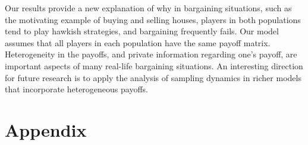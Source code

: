 \documentclass[12pt]{article}
\numberwithin{equation}{section}
\numberwithin{figure}{section}
\theoremstyle{definition}
\theoremstyle{plain}
\theoremstyle{plain}
\theoremstyle{plain}
\theoremstyle{remark}
\theoremstyle{plain}
\theoremstyle{plain}
\begin{document}
Our results provide a new explanation of why in bargaining situations, such as the motivating example of buying and selling houses, players in both populations tend to play hawkish strategies, and bargaining frequently fails.
Our model assumes that all players in each population have the same payoff matrix. Heterogeneity in the payoffs, and private information regarding one's payoff, are important aspects of many real-life bargaining situations. An interesting direction for future research is to apply the analysis of sampling dynamics in richer models that incorporate heterogeneous payoffs.  

\appendix
\section{Appendix\label{sec:Technical-Proofs}}
\end{document}
